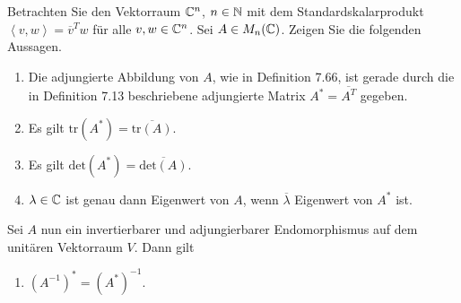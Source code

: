 \begin{Problem}
	Betrachten Sie den Vektorraum $\mathbb{C}^n$, $n\in \mathbb{N}$ mit dem Standardskalarprodukt $\left<v,w \right> = \overline{v}^Tw$ f\"{u}r alle $v,w\in \mathbb{C}^n$. Sei $A\in M_n(\mathbb{C})$. Zeigen Sie die folgenden Aussagen.
	\begin{enumerate}[label=(\alph*)]
		\item Die adjungierte Abbildung von $A$, wie in Definition 7.66, ist gerade durch die in Definition 7.13 beschriebene adjungierte Matrix $A^*=\overline{A^T}$ gegeben.
		\item Es gilt $\text{tr}(A^*)=\overline{\text{tr}(A)}$.
		\item Es gilt $\text{det}(A^*)=\overline{\text{det}(A)}$.
		\item $\lambda\in \mathbb{C}$ ist genau dann Eigenwert von $A$, wenn $\overline{\lambda}$ Eigenwert von $A^*$ ist.
	\end{enumerate}
Sei $A$ nun ein invertierbarer und adjungierbarer Endomorphismus auf dem unitären Vektorraum $V$. Dann gilt
\begin{enumerate}[label=(\alph*),resume]
	\item $\left( A^{-1} \right)^*=\left( A^* \right)^{-1}$.
\end{enumerate}
\end{Problem}
